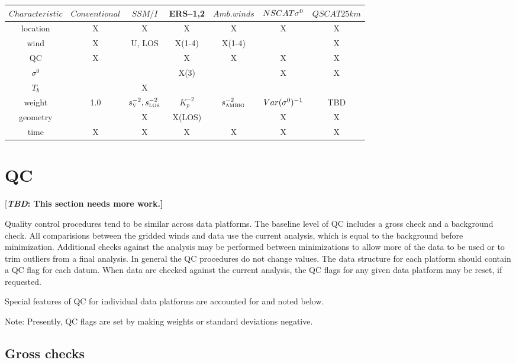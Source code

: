 \documentclass[11pt]{article}
\newcommand{\ers}[1]{ERS--{#1}}
\newcommand{\s}[1]{\mbox{$ \sigma^{#1} $}}
\newcommand{\xx}[1]{\section {#1}}
\newcommand{\xxx}[1]{\subsection {#1}}
\newcommand{\TBD}[1]{{[\bfseries{\itshape{TBD: }{{#1}}}]}}
\newcommand{\COMMENT}[2]{{[\bfseries {\itshape #1}: {#2}]}}
\renewcommand{\TBD}[1]{\COMMENT{TBD}{{#1}}}
\newcommand{\subsc}[2]{\mbox{$ #1_{\mbox{\sc \footnotesize #2}} $}}
\begin{document}
 \begin{center}
 \begin{tabular}[hbt]{|c|c|c|c|c|c|c|} \hline \hline
  \small$Characteristic$ & \small$Conventional$ & \small$SSM/I$ & \small\ers1,2 & \small$Amb. winds$ & \small$NSCAT \s0$ & \small$QSCAT 25km$ \\ \hline
  location & X    & X       & X       & X       & X           & X \\
  wind     & X    & U, LOS  & X(1-4)  & X(1-4)  &             & X \\
  QC       & X    &         & X       & X       & X           & X \\
  \s0      &      &         & X(3)    &         & X           & X \\
  $T_b$    &      & X       &         &         &             &   \\
  weight   & 1.0  & $\subsc{s^{-2}}{v},\subsc{s^{-2}}{los}$     & $K^{-2}_p$   & $\subsc{s^{-2}}{ambig}$       & $Var(\s0)^{-1}$  & TBD \\
  geometry &      & X       & X(LOS)  &         & X           & X \\
  time     & X    & X       & X       & X       & X           & X \\
  \hline
 \end{tabular}
 \end{center}

\xx {QC}

\TBD{This section needs more work.}

Quality control procedures tend to be similar across data
platforms.  The baseline level of QC includes a gross check and
a background check.  All comparisions between the gridded winds
and data use the current analysis, which is equal to the background
before minimization.  Additional checks against the analysis
may be performed between minimizations to allow more of the data to
be used or to trim outliers from a final analysis.  In general the
QC procedures do not change values.  The data structure for each 
platform should contain a QC flag for each datum.  When data are
checked against the current analysis, the QC flags for any given
data platform may be reset, if requested.

Special features of QC for individual data platforms are accounted
for and noted below.

Note: Presently, QC flags are set by making weights or standard
deviations negative.

\xxx {Gross checks}
\end{document}
